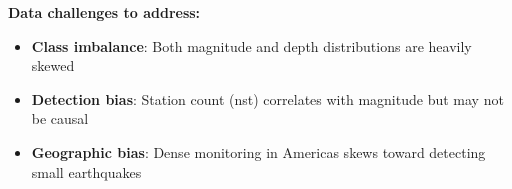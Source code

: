 \textbf{Data challenges to address:}
\begin{itemize}
    \item \textbf{Class imbalance}: Both magnitude and depth distributions are heavily skewed
    \item \textbf{Detection bias}: Station count (nst) correlates with magnitude but may not be causal
    \item \textbf{Geographic bias}: Dense monitoring in Americas skews toward detecting small earthquakes
\end{itemize}

